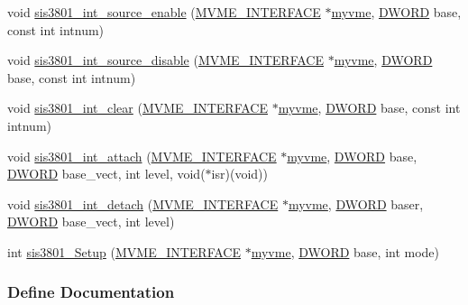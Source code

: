 \begin{DoxyCompactItemize}
\item 
void \hyperlink{sis3801_8h_af6703d63e671731c37eeebcb275464aa}{sis3801\_\-int\_\-source\_\-enable} (\hyperlink{structMVME__INTERFACE}{MVME\_\-INTERFACE} $\ast$\hyperlink{fevmemodules_8c_aeab89db2ad759342a32dcd50a0a0156c}{myvme}, \hyperlink{vt2_8h_a798af1e30bc65f319c1a246cecf59e39}{DWORD} base, const int intnum)
\item 
void \hyperlink{sis3801_8h_a3e7b10aa81fab64857ba1bf01fa0a129}{sis3801\_\-int\_\-source\_\-disable} (\hyperlink{structMVME__INTERFACE}{MVME\_\-INTERFACE} $\ast$\hyperlink{fevmemodules_8c_aeab89db2ad759342a32dcd50a0a0156c}{myvme}, \hyperlink{vt2_8h_a798af1e30bc65f319c1a246cecf59e39}{DWORD} base, const int intnum)
\item 
void \hyperlink{sis3801_8h_af12722909e5d4125828c425b88015072}{sis3801\_\-int\_\-clear} (\hyperlink{structMVME__INTERFACE}{MVME\_\-INTERFACE} $\ast$\hyperlink{fevmemodules_8c_aeab89db2ad759342a32dcd50a0a0156c}{myvme}, \hyperlink{vt2_8h_a798af1e30bc65f319c1a246cecf59e39}{DWORD} base, const int intnum)
\item 
void \hyperlink{sis3801_8h_a2b77796e1d3a01604babb9b8ad11621f}{sis3801\_\-int\_\-attach} (\hyperlink{structMVME__INTERFACE}{MVME\_\-INTERFACE} $\ast$\hyperlink{fevmemodules_8c_aeab89db2ad759342a32dcd50a0a0156c}{myvme}, \hyperlink{vt2_8h_a798af1e30bc65f319c1a246cecf59e39}{DWORD} base, \hyperlink{vt2_8h_a798af1e30bc65f319c1a246cecf59e39}{DWORD} base\_\-vect, int level, void($\ast$isr)(void))
\item 
void \hyperlink{sis3801_8h_aabfff334589d256ec03c1f7e6bc7969b}{sis3801\_\-int\_\-detach} (\hyperlink{structMVME__INTERFACE}{MVME\_\-INTERFACE} $\ast$\hyperlink{fevmemodules_8c_aeab89db2ad759342a32dcd50a0a0156c}{myvme}, \hyperlink{vt2_8h_a798af1e30bc65f319c1a246cecf59e39}{DWORD} baser, \hyperlink{vt2_8h_a798af1e30bc65f319c1a246cecf59e39}{DWORD} base\_\-vect, int level)
\item 
int \hyperlink{sis3801_8h_ac57f9b90cd1c32f77787df8702ece6d0}{sis3801\_\-Setup} (\hyperlink{structMVME__INTERFACE}{MVME\_\-INTERFACE} $\ast$\hyperlink{fevmemodules_8c_aeab89db2ad759342a32dcd50a0a0156c}{myvme}, \hyperlink{vt2_8h_a798af1e30bc65f319c1a246cecf59e39}{DWORD} base, int mode)
\end{DoxyCompactItemize}


\subsubsection{Define Documentation}
